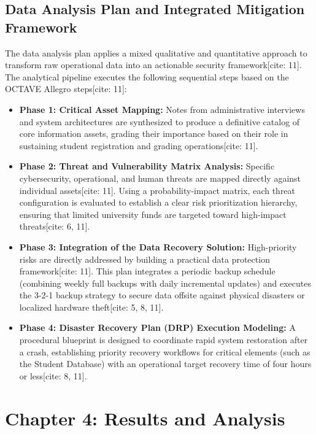 \documentclass[journal,onecolumn,12pt,twoside]{IEEEtran}
\begin{document}
	\subsection{Data Analysis Plan and Integrated Mitigation Framework}
	\label{subsec:analysis_plan}
	The data analysis plan applies a mixed qualitative and quantitative approach to transform raw operational data into an actionable security framework[cite: 11]. The analytical pipeline executes the following sequential steps based on the OCTAVE Allegro steps[cite: 11]:
	\begin{itemize}
		\item \textbf{Phase 1: Critical Asset Mapping:} Notes from administrative interviews and system architectures are synthesized to produce a definitive catalog of core information assets, grading their importance based on their role in sustaining student registration and grading operations[cite: 11].
		\item \textbf{Phase 2: Threat and Vulnerability Matrix Analysis:} Specific cybersecurity, operational, and human threats are mapped directly against individual assets[cite: 11]. Using a probability-impact matrix, each threat configuration is evaluated to establish a clear risk prioritization hierarchy, ensuring that limited university funds are targeted toward high-impact threats[cite: 6, 11].
		\item \textbf{Phase 3: Integration of the Data Recovery Solution:} High-priority risks are directly addressed by building a practical data protection framework[cite: 11]. This plan integrates a periodic backup schedule (combining weekly full backups with daily incremental updates) and executes the 3-2-1 backup strategy to secure data offsite against physical disasters or localized hardware theft[cite: 5, 8, 11].
		\item \textbf{Phase 4: Disaster Recovery Plan (DRP) Execution Modeling:} A procedural blueprint is designed to coordinate rapid system restoration after a crash, establishing priority recovery workflows for critical elements (such as the Student Database) with an operational target recovery time of four hours or less[cite: 8, 11].
	\end{itemize}
	
	
	\newpage
	\section{Chapter 4: Results and Analysis}
	\label{sec:results}
	
\end{document}
